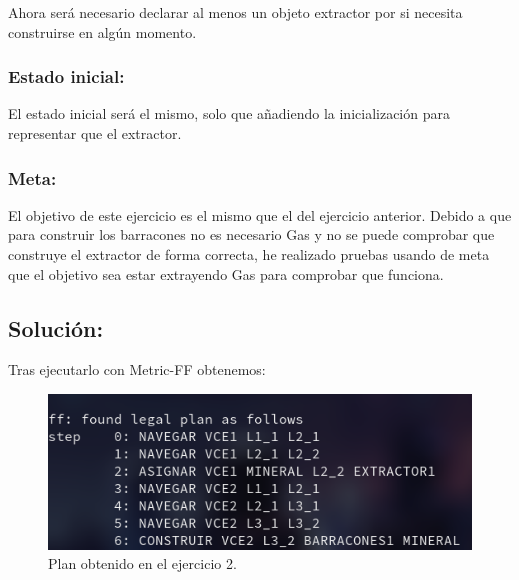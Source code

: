 \documentclass[10pt, spanish]{article}
\begin{document}
Ahora será necesario declarar al menos un objeto extractor por si necesita construirse en algún momento.

\subsubsection{Estado inicial:}

El estado inicial será el mismo, solo que añadiendo la inicialización para representar que el extractor.

\subsubsection{Meta:}

El objetivo de este ejercicio es el mismo que el del ejercicio anterior. Debido a que para construir los barracones no es necesario Gas y no se puede comprobar que construye el extractor de forma correcta, he realizado pruebas usando de meta que el objetivo sea estar extrayendo Gas para comprobar que funciona.

\subsection{Solución:}

\begin{multicols}{2}

Tras ejecutarlo con Metric-FF obtenemos:


\begin{figure}[H]
	\centering
	\vspace*{-1cm}\includegraphics[scale=0.3]{plan2.png}
	\caption{Plan obtenido en el ejercicio 2.}
	\label{plan2}
\end{figure}

\end{multicols}
\end{document}
